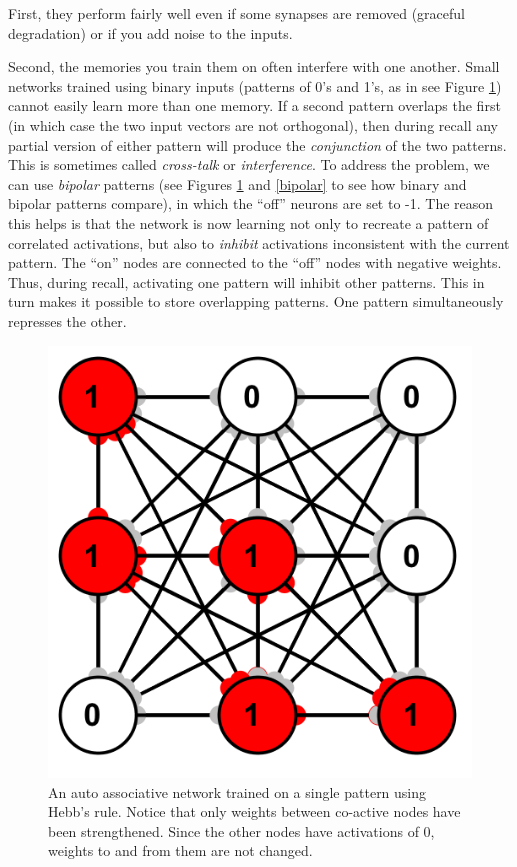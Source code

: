 First, they perform fairly well even if some synapses are removed (graceful degradation) or if you add noise to the inputs.

Second, the memories you train them on often interfere with one another. Small networks trained using binary inputs (patterns of 0's and 1's, as in see Figure \ref{binary}) cannot easily learn more than one  memory. If a second pattern overlaps the first (in which case the two input vectors are not orthogonal), then during recall any partial version of either pattern will produce the \emph{conjunction} of the two patterns. This is sometimes called \emph{cross-talk} or \emph{interference}. To address the problem, we can use \emph{bipolar} patterns (see Figures \ref{binary} and \ref{bipolar} to see how binary and bipolar patterns compare), in which the ``off'' neurons are set to -1. The reason this helps is that the network is now learning not only to recreate a pattern of correlated activations, but also to \emph{inhibit} activations inconsistent with the current pattern. The ``on'' nodes are connected to the ``off'' nodes with negative weights. Thus, during recall, activating one pattern will inhibit other patterns. This in turn makes it possible to store overlapping patterns. One pattern simultaneously represses the other. 

\begin{figure}[h]
\centering
\includegraphics[scale=.6]{./images/hebb_binary_9.png}
\caption[Simbrain screenshot.]{An auto associative network trained on a single pattern using Hebb's rule. Notice that only weights between co-active nodes have been strengthened. Since the other nodes have activations of 0, weights to and from them are not changed.}
\label{binary}
\end{figure}

